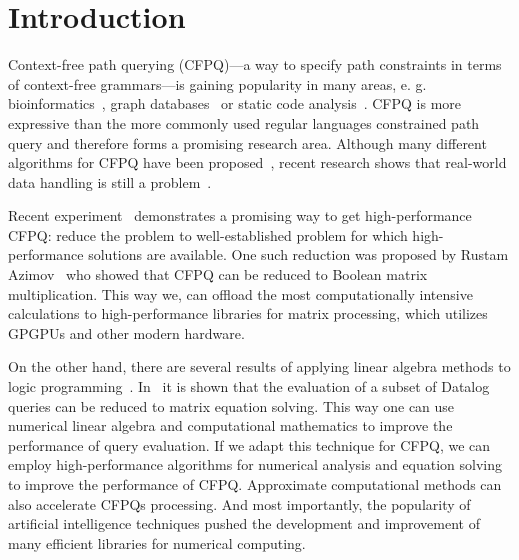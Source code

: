 \documentclass[sigconf]{acmart}
\begin{document}



\maketitle

\section{Introduction}

Context-free path querying (CFPQ)---a way to specify path constraints in terms of context-free grammars---is gaining popularity in many areas, e. g. bioinformatics~\cite{sevon2008subgraph}, graph databases~\cite{yannakakis1990graph,Medeiros:2018:EEC:3167132.3167265,Kuijpers:2019:ESC:3335783.3335791} or static code analysis~\cite{Reps,zhang2013fast}.
CFPQ is more expressive than the more commonly used regular languages constrained path query and therefore forms a promising research area.
Although many different algorithms for CFPQ have been proposed~\cite{RDF,Medeiros:2018:EEC:3167132.3167265,azimov2018context,Verbitskaia:2018:PCC:3241653.3241655,10.1007/978-3-319-91662-0_17}, recent research shows that real-world data handling is still a problem~\cite{Kuijpers:2019:ESC:3335783.3335791}.

Recent experiment~\cite{mishin2019evaluation} demonstrates a promising way to get high-performance CFPQ: reduce the problem to well-established problem for which high-performance solutions are available.
One such reduction was proposed by Rustam Azimov~\cite{azimov2018context} who showed that CFPQ can be reduced to Boolean matrix multiplication.
This way we, can offload the most computationally intensive calculations to high-performance libraries for matrix processing, which utilizes GPGPUs and other modern hardware.

On the other hand, there are several results of applying linear algebra methods to logic programming~\cite{sato2017linear, aspis2018linear}.
In~\cite{sato2017linear} it is shown that the evaluation of a subset of Datalog queries can be reduced to matrix equation solving.
This way one can use numerical linear algebra and computational mathematics to improve the performance of query evaluation.
If we adapt this technique for CFPQ, we can employ high-performance algorithms for numerical analysis and equation solving to improve the performance of CFPQ.
Approximate computational methods can also accelerate CFPQs processing.
And most importantly, the popularity of artificial intelligence techniques pushed the development and improvement of many efficient libraries for numerical computing.
\end{document}
